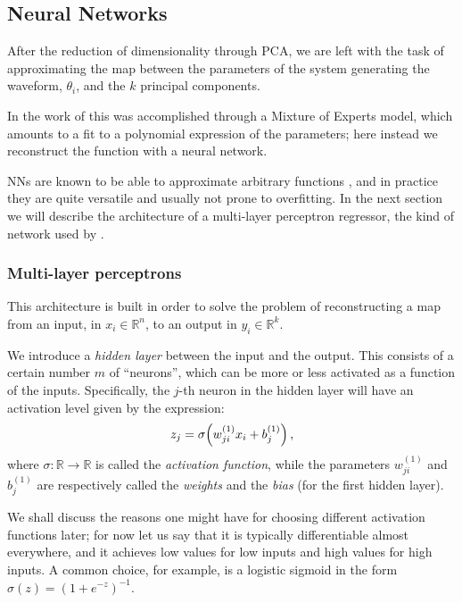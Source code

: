 \documentclass[main.tex]{subfiles}
\begin{document}
\subsection{Neural Networks} \label{sec:neural-network}

After the reduction of dimensionality through \ac{PCA}, we are left with the task of approximating the map between the parameters of the system generating the waveform, \(\theta _i\), and the \(k\) principal components. 

In the work of \textcite[]{schmidtMachineLearningGravitational2020} this was accomplished through a Mixture of Experts model, which amounts to a fit to a polynomial expression of the parameters; here instead we reconstruct the function with a neural network. 

\acsp{NN} are known to be able to approximate arbitrary functions \cite[]{nielsenNeuralNetworksDeep2015}, and in practice they are quite versatile and usually not prone to overfitting. 
In the next section we will describe the architecture of a multi-layer perceptron regressor, the kind of network used by \mb.

\subsubsection{Multi-layer perceptrons}

This architecture is built in order to solve the problem of reconstructing a map from an input, in \(x_i \in \mathbb{R}^{n}\), to an output in \(y_i \in \mathbb{R}^{k}\).

We introduce a \emph{hidden layer} between the input and the output. 
This consists of a certain number \(m\) of ``neurons'', which can be more or less activated as a function of the inputs.
Specifically, the \(j\)-th neuron in the hidden layer will have an activation level given by the expression: 
%
\begin{align} \label{eq:nn-one-layer}
z_j = \sigma \qty( w^{(1)}_{ji} x_i + b^{(1)}_j)
\,,
\end{align}
%
where \(\sigma \colon \mathbb{R} \to \mathbb{R}\) is called the \emph{activation function}, while the parameters \(w^{(1)}_{ji}\) and \(b^{(1)}_j\) are respectively called the \emph{weights} and the \emph{bias} (for the first hidden layer). 

We shall discuss the reasons one might have for choosing different activation functions later; for now let us say that it is typically differentiable almost everywhere, and it achieves low values for low inputs and high values for high inputs.
A common choice, for example, is a logistic sigmoid in the form \(\sigma (z) = (1 + e^{-z})^{-1}\). 
\end{document}
